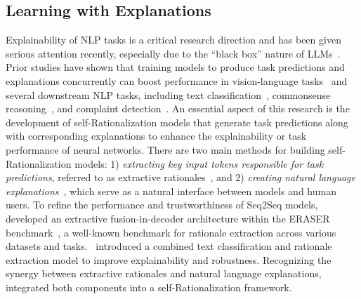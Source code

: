 \subsection{Learning with Explanations}
Explainability of NLP tasks is a critical research direction and has been given serious attention recently, especially due to the ``black box'' nature of LLMs~\citep{dalal-etal-2024-inference,hu2024learning,yu2024mind,saeed2024sumex,DBLP:conf/aaai/YuJLHWLCLLTZZXH24,DBLP:conf/coling/XuLD0CJZLXH25}. Prior studies have shown that training models to produce task predictions and explanations concurrently can boost performance in vision-language tasks~\citep{majumder2022knowledge,DBLP:conf/icassp/LiCLXCZ23,DBLP:conf/aaai/LiL0LHYY024} and several downstream NLP tasks, including text classification~\citep{li2022unifying,DBLP:conf/nips/LiZLML0HY24}, commonsense reasoning~\citep{veerubhotla-etal-2023-shot,yan2025position,DBLP:conf/coling/HuangMLHZ0Z24,DBLP:conf/sigir/LiLHYS022,DBLP:journals/tkde/LiHZZLLCZS23}, and complaint detection~\citep{singh-etal-2023-peeking}. An essential aspect of this research is the development of self-Rationalization models that generate task predictions along with corresponding explanations to enhance the explainability or task performance of neural networks. There are two main methods for building self-Rationalization models: 1) \textit{extracting key input tokens responsible for task predictions}, referred to as extractive rationales~\citep{deyoung-etal-2020-eraser}, and 2) \textit{creating natural language explanations}~\citep{narang2020wt5}, which serve as a natural interface between models and human users. To refine the performance and trustworthiness of Seq2Seq models,~\citet{lakhotia-etal-2021-fid} developed an extractive fusion-in-decoder architecture within the ERASER benchmark~\citep{deyoung-etal-2020-eraser}, a well-known benchmark for rationale extraction across various datasets and tasks.~\citet{li2022unifying} introduced a combined text classification and rationale extraction model to improve explainability and robustness. Recognizing the synergy between extractive rationales and natural language explanations,~\citet{majumder2022knowledge} integrated both components into a self-Rationalization framework.

